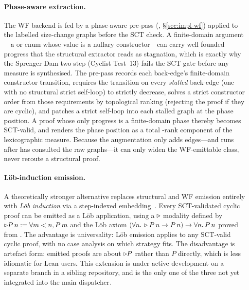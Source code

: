 \paragraph{Phase-aware extraction.}
The WF backend is fed by a phase-aware pre-pass
(, §\ref{sec:impl-wf}) applied to the labelled
size-change graphs before the SCT check. A finite-domain argument---a
 or enum whose value is a nullary constructor---can carry
well-founded progress that the structural extractor reads as stagnation, which
is exactly why the Sprenger-Dam two-step (Cyclist Test~13) fails the SCT gate
before any measure is synthesised. The pre-pass records each back-edge's
finite-domain constructor transition, requires the transition on every
\emph{stalled} back-edge (one with no structural strict self-loop) to strictly
decrease, solves a strict constructor order from those requirements by
topological ranking (rejecting the proof if they are cyclic), and patches a
strict self-loop into each stalled graph at the phase position. A proof whose
only progress is a finite-domain phase thereby becomes SCT-valid, and
 renders the phase position as a total -rank
component of the lexicographic measure. Because the augmentation only adds
edges---and runs after  has consulted the raw
graphs---it can only widen the WF-emittable class, never reroute a structural
proof.

\paragraph{Löb-induction emission.}
A theoretically stronger alternative replaces structural and WF emission
entirely with \emph{Löb induction} via a step-indexed
embedding~\cite{atkey2013productive, jung2015iris}. Every SCT-validated
cyclic proof can be emitted as a Löb application, using a \(\triangleright\)
modality defined by \(\triangleright P\, n := \forall m < n, P\, m\) and the Löb
axiom \((\forall n.\, \triangleright P\, n \to P\, n) \to \forall n.\, P\, n\)
proved from . The advantage is universality: Löb
emission applies to any SCT-valid cyclic proof, with no case analysis on
which strategy fits. The disadvantage is artefact form: emitted proofs are
about \(\triangleright P\) rather than \(P\) directly, which is less idiomatic for
Lean users. This extension is under active development on a separate
 branch in a sibling repository, and is the only one of the
three not yet integrated into the main dispatcher.

